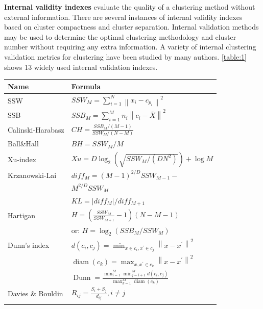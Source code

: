 \documentclass[a4paper, 12pt]{article}
\begin{document}
\textbf{Internal validity indexes} evaluate the quality of a clustering method without external information. There are several instances of internal validity indexes based on cluster compactness and cluster separation. Internal validation methods may be used to determine the optimal clustering methodology and cluster number without requiring any extra information. A variety of internal clustering validation metrics for clustering have been studied by many authors. \autoref{table:1} shows 13 widely used internal validation indexes.  

\begin{tabularx}{\linewidth}{|X|l|}
    \caption{Internal Validity Indexes \citep{zhao2014wb}.} \\
    \hline \textbf{Name} & \textbf{Formula} \\
    \hline SSW & $SSW_{M}=\sum_{i=1}^{N}\left\|x_{i}-c_{p_{i}}\right\|^{2}$ \\
    \hline SSB & $SSB_{M}=\sum_{i=1}^{M} n_{i}\left\|c_{i}-\bar{X}\right\|^{2}$ \\
    \hline Calinski-Harabasz \citep{calinski1974dendrite} & $CH=\frac{S S B_{M} /(M-1)}{S S W_{M} /(N-M)}$ \\
    \hline Ball\&Hall \citep{ball1965isodata} & $BH=S S W_{M} / M$ \\
    \hline Xu-index \citep{xu1997bayesian} & $Xu=D \log_{2}\left(\sqrt{S S W_{M} /\left(D N^{2}\right)}\right)+\log M$ \\
    \hline Krzanowski-Lai \citep{krzanowski1988criterion} & ${diff}_{M}=(M-1)^{2 / D} SSW_{M-1}-$ \\ & $M^{2 / D} SSW_{M}$ \\ & $KL=\left|{diff}_{M}\right| / {diff}_{M+1}$ \\
    \hline Hartigan \citep{hartigan1975clustering} & $H=\left(\frac{S S W_{M}}{S S W_{M+1}}-1\right)(N-M-1)$ \\ & or: $H=\log _{2}\left(SSB_{M} / SSW_{M}\right)$ \\
    \hline Dunn's index \citep{dunn1974well} & $d\left(c_{i}, c_{j}\right)=\min _{x \in c_{i}, x^{\prime} \in c_{j}}\left\|x-x^{\prime}\right\|^{2}$ \\ &
    $\operatorname{diam}\left(c_{k}\right)=\max _{x, x^{\prime} \in c_{k}}\left\|x-x^{\prime}\right\|^{2}$ \\ &
    $\operatorname{Dunn}=\frac{\min _{i=1}^{M} \min _{j=i+1}^{M} d\left(c_{i}, c_{j}\right)}{\max _{k=1}^{M} \operatorname{diam}\left(c_{k}\right)}$ \\
    \hline Davies \& Bouldin \citep{davies1979cluster} & $R_{i j}=\frac{S_{i}+S_{j}}{d_{i j}}, i \neq j$ \\ &

\end{tabularx}
\end{document}
